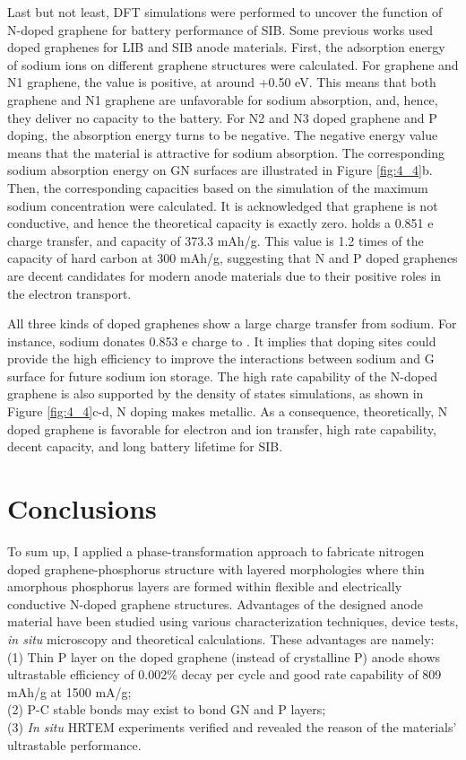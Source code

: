 Last but not least, DFT simulations were performed to uncover the function of N-doped graphene for battery performance of SIB. 
Some previous works used doped graphenes for LIB and SIB anode materials.\cite{Yang2011c,Wen2014b,Wang2013h,Wang2012e,Wang2014f} 
First, the adsorption energy of sodium ions on different graphene structures were calculated. 
For graphene and N1 graphene, the value is positive, at around +0.50 eV. 
This means that both graphene and N1 graphene are unfavorable for sodium absorption, and, hence, they deliver no capacity to the battery. 
For N2 and N3 doped graphene and P doping, the absorption energy turns to be negative. 
The negative energy value means that the material is attractive for sodium absorption. 
The corresponding sodium absorption energy on GN surfaces are illustrated in Figure \ref{fig:4_4}b. 
Then, the corresponding capacities based on the simulation of the maximum sodium concentration were calculated. 
It is acknowledged that graphene is not conductive, and hence the theoretical capacity is exactly zero.
 holds a 0.851 e charge transfer, and capacity of 373.3 mAh/g. This value is 1.2 times of the capacity of hard carbon at 300 mAh/g, suggesting that N and P doped graphenes are decent candidates for modern anode materials due to their positive roles in the electron transport. 

All three kinds of doped graphenes show a large charge transfer from sodium.
For instance, sodium donates 0.853 e charge to . 
It implies that doping sites could provide the high efficiency to improve the interactions between sodium and G surface for future sodium ion storage. 
The high rate capability of the N-doped graphene is also supported by the density of states simulations, as shown in Figure \ref{fig:4_4}c-d, N doping makes  metallic. 
As a consequence, theoretically, N doped graphene is favorable for electron and ion transfer, high rate capability, decent capacity, and long battery lifetime for SIB.
\vfill %

\section{Conclusions}
To sum up, I applied a phase-transformation approach to fabricate nitrogen doped graphene-phosphorus structure with layered morphologies where thin amorphous phosphorus layers are formed within flexible and electrically conductive N-doped graphene structures. 
Advantages of the designed anode material have been studied using various characterization techniques, device tests, {\em in situ} microscopy and theoretical calculations. 
These advantages are namely: \\
(1) Thin P layer on the doped graphene (instead of crystalline P) anode shows ultrastable efficiency of 0.002\% decay per cycle and good rate capability of 809 mAh/g at 1500 mA/g; \\
(2) P-C stable bonds may exist to bond GN and P layers; \\
(3) {\em In situ} HRTEM experiments verified and revealed the reason of the materials' ultrastable performance.\\

